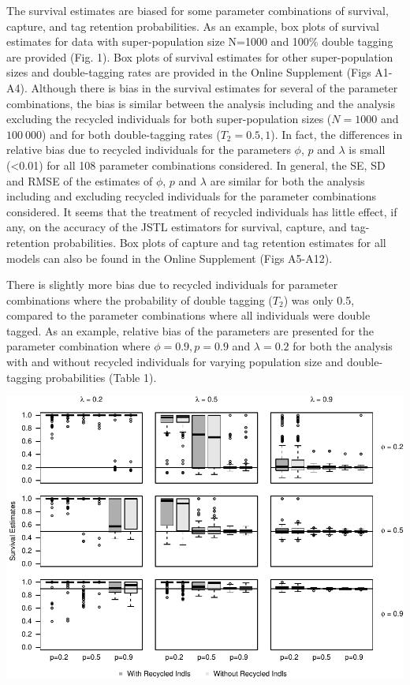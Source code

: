 \documentclass[12pt]{article}
\begin{document}
The survival estimates are biased for some
parameter combinations of survival, capture, and tag retention
probabilities. As an example, box plots of survival estimates for data
with super-population size N=1000 and 100\% double tagging are provided
(Fig. 1). Box plots of survival estimates for other super-population
sizes and double-tagging rates are provided in the Online Supplement (Figs
A1-A4). Although there is bias in the survival estimates for several of
the parameter combinations, the bias is similar between the analysis
including and the analysis excluding the recycled individuals for both
super-population sizes (\(N=1000\) and \(100\ 000\)) and for both
double-tagging rates (\(T_2=0.5,1\)). In fact, the differences in
relative bias due to recycled individuals for the parameters \(\phi\),
\(p\) and \(\lambda\) is small (\textless{}0.01) for all 108 parameter
combinations considered. In general, the SE, SD and RMSE of the
estimates of \(\phi\), \(p\) and \(\lambda\) are similar for both the
analysis including and excluding recycled individuals for the parameter
combinations considered. It seems that the treatment of
recycled individuals has little effect, if any, on the accuracy of the
JSTL estimators for survival, capture, and tag-retention probabilities.
Box plots of capture and tag retention estimates for all models can also
be found in the Online Supplement (Figs A5-A12).

There is slightly more bias due to recycled individuals for parameter combinations 
where the probability of double tagging (\(T_2\)) was only 0.5, compared to the parameter combinations where all individuals were double tagged. As an example, relative bias of
the parameters are presented for the parameter combination where
\(\phi=0.9, p=0.9\) and \(\lambda=0.2\) for both the analysis with and
without recycled individuals for varying population size and
double-tagging probabilities (Table 1).

\includegraphics{RecycledPaper_files/figure-latex/Figure1_survival_GJSTL1-1.pdf}
\end{document}
